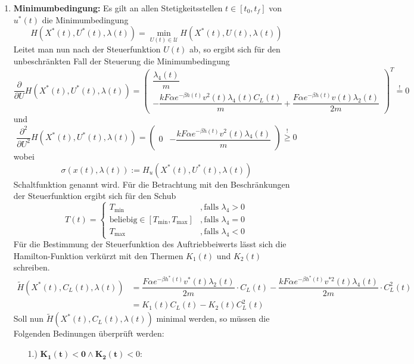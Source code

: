 \begin{enumerate}
    \item \textbf{Minimumbedingung:} Es gilt an allen Stetigkeitsstellen $t \in [t_0,t_f]$ von $u^{\ast}(t)$ die Minimumbedingung \[H(X^{\ast}(t),U^{\ast}(t),\lambda(t)) = \min_{U(t) \in \mathcal{U}} H(X^{\ast}(t),U(t),\lambda(t))\] Leitet man nun nach der Steuerfunktion $U(t)$ ab, so ergibt sich für den unbeschränkten Fall der Steuerung die Minimumbedingung
    \[\dfrac{\partial}{\partial U} H(X^{\ast}(t),U^{\ast}(t),\lambda(t)) = \begin{pmatrix}
    \dfrac{\lambda_4(t)}{m} \\ 
    - \dfrac{k F \alpha e^{-\beta h(t)} v^2(t) \lambda_4(t) C_L(t)}{m} + \dfrac{F \alpha e^{-\beta h(t)} v(t) \lambda_2(t)}{2m}
    \end{pmatrix}^T \stackrel{!}{=} 0\]
    und 
    \[\dfrac{\partial^2}{\partial U^2} H(X^{\ast}(t),U^{\ast}(t),\lambda(t)) = \begin{pmatrix}
    0 & - \dfrac{k F \alpha e^{-\beta h(t)} v^2(t) \lambda_4(t)}{m} 
    \end{pmatrix} \stackrel{!}{\geq} 0\] wobei \[\sigma(x(t),\lambda(t)) := H_u(X^{\ast}(t),U^{\ast}(t),\lambda(t))\] Schaltfunktion genannt wird. Für die Betrachtung mit den Beschränkungen der Steuerfunktion ergibt sich für den Schub
\[T(t) = \left\lbrace \begin{array}{ll}
T_{\min} & ,\text{falls } \lambda_4 > 0  \\ 
\text{beliebig} \in [T_{\min},T_{\max}] & ,\text{falls } \lambda_4 = 0  \\ 
T_{\max} & ,\text{falls } \lambda_4 < 0
\end{array} \right.\]
Für die Bestimmung der Steuerfunktion des Auftriebbeiwerts lässt sich die Hamilton-Funktion verkürzt mit den Thermen $K_1(t)$ und $K_2(t)$ schreiben.
    \[\begin{split}
        \tilde{H}(X^{\ast}(t),C_L(t),\lambda(t)) &= \dfrac{F \alpha e^{-\beta h^{\ast}(t)} v^{\ast}(t) \lambda_2(t)}{2m} \cdot C_L(t) - \dfrac{k F \alpha e^{-\beta h^{\ast}(t)}  v^{\ast 2}(t) \lambda_4(t)}{2m} \cdot C_L^2(t) \\\
        &= K_1(t) C_L(t) - K_2(t) C_L^2(t)
    \end{split}\]
Soll nun $\tilde{H}(X^{\ast}(t),C_L(t),\lambda(t))$ minimal werden, so müssen die Folgenden Bedinungen überprüft werden:
    \begin{enumerate}
        \item[1.)] $\mathbf{K_1(t) < 0 \wedge K_2(t)} < 0$:

\end{enumerate}
\end{enumerate}
